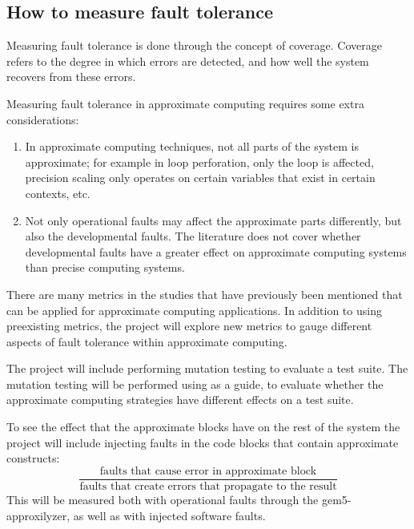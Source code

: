 

\subsection{How to measure fault tolerance}
Measuring fault tolerance is done through the concept of coverage. Coverage refers to the degree in which errors are detected, and how well the system recovers from these errors. 

Measuring fault tolerance in approximate computing requires some extra considerations:
\begin{enumerate}
    \item  In approximate computing techniques, not all parts of the system is approximate; for example in loop perforation, only the loop is affected, precision scaling only operates on certain variables that exist in certain contexts, etc.
    \item Not only operational faults may affect the approximate parts differently, but also the developmental faults. The literature does not cover whether developmental faults have a greater effect on approximate computing systems than precise computing systems. 
\end{enumerate}


There are many metrics in the studies that have previously been mentioned that can be applied for approximate computing applications. In addition to using preexisting metrics, the project will explore new metrics to gauge different aspects of fault tolerance within approximate computing.  

  The project will include performing mutation testing to evaluate a test suite. The mutation testing will be performed using \citet{papadakis2019mutation} as a guide, to evaluate whether the approximate computing strategies have different effects on a test suite.


To see the effect that the approximate blocks have on the rest of the system the project will include injecting faults in the code blocks that contain approximate constructs: 
$$\frac{\text{faults that cause error in approximate block}}{\text{faults that create errors that propagate to the result}}$$
This will be measured both with operational faults through the gem5-approxilyzer\citep{venkatagiri2019gem5}, as well as with injected software faults. 


